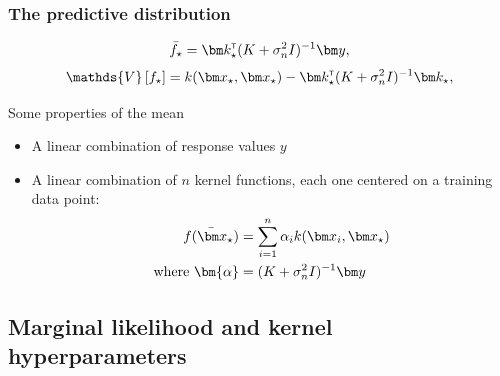 
\begin{frame}
\frametitle{The predictive distribution}
\renewcommand\theequation{2.\thedefcounter}
\setcounter{defcounter}{25}
\begin{equation}
\bar{f_{\star}} = \bk_{\star}\transpose(K + \sigma_n^2 I)\inv\by,
\end{equation}
\renewcommand\theequation{2.\thedefcounter}
\setcounter{defcounter}{26}
\begin{equation}
\mathds{V} \left[ f_{\star} \right]  = k(\bx_{\star}, \bx_{\star}) - \bk_{\star}\transpose (K + \sigma_n^2
I)\inv\bk_{\star},
\end{equation}

Some properties of the mean
\begin{itemize}
  \item A linear combination of response values $y$
  \item A linear combination of $n$ kernel functions, each one centered on a training data point:\\

  \renewcommand\theequation{2.\thedefcounter}
  \setcounter{defcounter}{27}
  \begin{align}
  \bar{f(\bx_{\star})} &= \sum_{i=1}^n \alpha_i k(\bx_i, \bx_{\star}) \\
  \nonumber{} \text{where } \bm{\alpha} &= (K + \sigma_n^2 I)\inv \by
  \end{align}

\end{itemize}
\end{frame}


\subsection{Marginal likelihood and kernel hyperparameters}
\begin{frame}
\tableofcontents[currentsubsection]
\end{frame}


